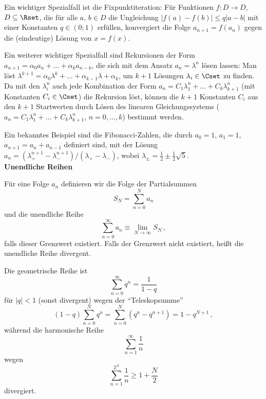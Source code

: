 \documentclass[a4paper,10pt]{article}
\begin{document}
Ein wichtiger Spezialfall ist die Fixpunktiteration:
Für Funktionen $f:D\to D$, $D\subseteq\Rset$, die für alle $a$, $b\in D$
die Ungleichung
$|f(a)-f(b)|\le q|a-b|$ mit
einer Konstanten $q\in(0;1)$ erfüllen,
konvergiert die Folge $a_{n+1}=f(a_n)$ gegen die (eindeutige) Lösung
von $x=f(x)$.

Ein weiterer wichtiger Spezialfall sind Rekursionen der Form
$a_{n+1}=\alpha_0 a_n +\ldots+\alpha_k a_{n-k}$, die sich mit
dem Ansatz $a_n=\lambda^n$ lösen lassen:
Man löst $\lambda^{k+1} = \alpha_0 \lambda^k+\ldots+\alpha_{k-1}\lambda+\alpha_k$, um
$k+1$ Lösungen $\lambda_i\in\Cset$ zu finden.
Da mit den $\lambda_i^n$ auch jede Kombination der Form
$a_n=C_1\lambda_1^n+\ldots+C_k\lambda_{k+1}^n$ (mit Konstanten $C_i\in\Cset$)
die Rekursion löst, können die $k+1$ Konstanten $C_i$ aus den $k+1$
Startwerten durch Lösen des linearen Gleichungssystems
($a_n=C_1\lambda_1^n+\ldots+C_k\lambda_{k+1}^n$, $n=0,\ldots,k$)
bestimmt werden.

Ein bekanntes Beispiel sind die Fibonacci-Zahlen, die durch
$a_0=1$, $a_1=1$, $a_{n+1}=a_n+a_{n-1}$ definiert sind,
mit der Lösung
$a_n=(\lambda_+^{n+1}-\lambda_-^{n+1})/(\lambda_+-\lambda_-)$, wobei
$\lambda_\pm = \frac{1}{2}\pm\frac{1}{2}\sqrt{5}$.\\


{\bf Unendliche Reihen}

Für eine Folge $a_n$ definieren wir die Folge der Partialsummen
\[
S_N=\sum_{n=0}^N a_n
\]
und die unendliche Reihe
\[
\sum_{n=0}^\infty a_n \equiv \lim_{N\to\infty} S_N \,,
\]
falls dieser Grenzwert existiert. Falls der Grenzwert nicht existiert,
heißt die unendliche Reihe divergent.

Die geometrische Reihe ist
\[
\sum_{n=0}^\infty q^n = \frac{1}{1-q}
\]
für $|q|<1$ (sonst divergent) wegen der ``Teleskopsumme''
\[
(1-q)\sum_{n=0}^N q^n = \sum_{n=0}^N \left(q^n-q^{n+1}\right) = 1-q^{N+1} \,,
\]
während die harmonische Reihe
\[
\sum_{n=1}^\infty \frac{1}{n}
\]
wegen
\[
\sum_{n=1}^{2^N} \frac{1}{n} \ge 1 + \frac{N}{2}
\]
divergiert.
\end{document}
